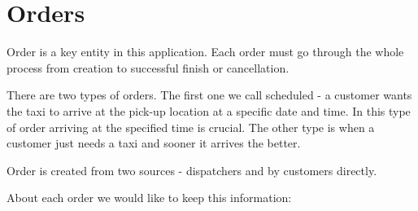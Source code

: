 	\section{Orders}
	 	Order is a key entity in this application. Each order must go through the whole process from creation to successful finish or cancellation.
	 	
	 	There are two types of orders. The first one we call scheduled - a customer wants the taxi to arrive at the pick-up location at a specific date and time. In this type of order arriving at the specified time is crucial. The other type is when a customer just needs a taxi and sooner it arrives the better.
	 	
	 	Order is created from two sources - dispatchers and by customers directly.
	 	
	 	About each order we would like to keep this information:
		
